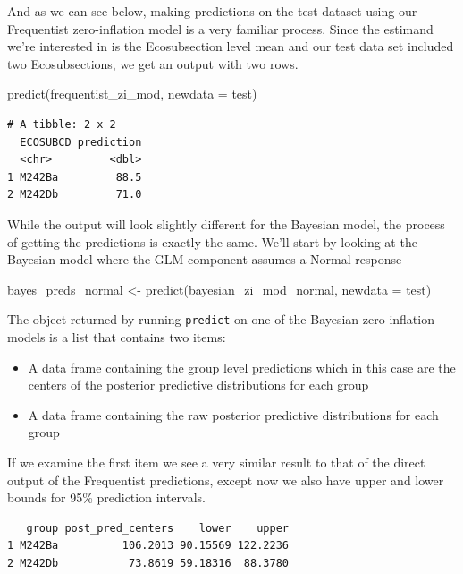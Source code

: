 \documentclass[12pt,twoside]{reedthesis}
\newenvironment{Shaded}{\begin{snugshade}}{\end{snugshade}}
\newcommand{\AttributeTok}[1]{\textcolor[rgb]{0.77,0.63,0.00}{#1}}
\newcommand{\FunctionTok}[1]{\textcolor[rgb]{0.00,0.00,0.00}{#1}}
\newcommand{\NormalTok}[1]{#1}
\newcommand{\OtherTok}[1]{\textcolor[rgb]{0.56,0.35,0.01}{#1}}
\newcommand{\SpecialCharTok}[1]{\textcolor[rgb]{0.00,0.00,0.00}{#1}}
\providecommand{\tightlist}{%
  \setlength{\itemsep}{0pt}\setlength{\parskip}{0pt}}
\begin{document}
And as we can see below, making predictions on the test dataset using our Frequentist zero-inflation model is a very familiar process. Since the estimand we're interested in is the Ecosubsection level mean and our test data set included two Ecosubsections, we get an output with two rows.
\begin{Shaded}
\begin{Highlighting}[]
\FunctionTok{predict}\NormalTok{(frequentist\_zi\_mod, }\AttributeTok{newdata =}\NormalTok{ test)}
\end{Highlighting}
\end{Shaded}
\begin{verbatim}
# A tibble: 2 x 2
  ECOSUBCD prediction
  <chr>         <dbl>
1 M242Ba         88.5
2 M242Db         71.0
\end{verbatim}
While the output will look slightly different for the Bayesian model, the process of getting the predictions is exactly the same. We'll start by looking at the Bayesian model where the GLM component assumes a Normal response
\begin{Shaded}
\begin{Highlighting}[]
\NormalTok{bayes\_preds\_normal }\OtherTok{\textless{}{-}} \FunctionTok{predict}\NormalTok{(bayesian\_zi\_mod\_normal, }\AttributeTok{newdata =}\NormalTok{ test)}
\end{Highlighting}
\end{Shaded}
The object returned by running \texttt{predict} on one of the Bayesian zero-inflation models is a list that contains two items:
\begin{itemize}
\tightlist
\item
  A data frame containing the group level predictions which in this case are the centers of the posterior predictive distributions for each group
\item
  A data frame containing the raw posterior predictive distributions for each group
\end{itemize}
If we examine the first item we see a very similar result to that of the direct output of the Frequentist predictions, except now we also have upper and lower bounds for 95\% prediction intervals.
\begin{Shaded}
\end{Shaded}
\begin{verbatim}
   group post_pred_centers    lower    upper
1 M242Ba          106.2013 90.15569 122.2236
2 M242Db           73.8619 59.18316  88.3780
\end{verbatim}
\end{document}
